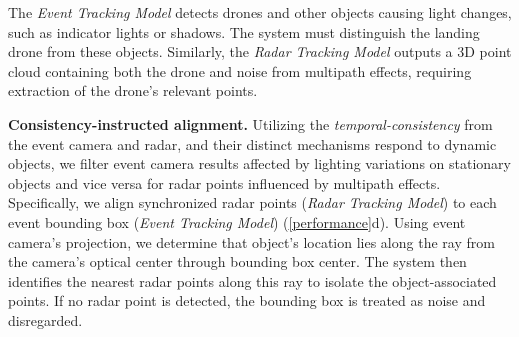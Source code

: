 The \textit{Event Tracking Model} detects drones and other objects causing light changes, such as indicator lights or shadows. The system must distinguish the landing drone from these objects. Similarly, the \textit{Radar Tracking Model} outputs a 3D point cloud containing both the drone and noise from multipath effects, requiring extraction of the drone’s relevant points.

\textbf{Consistency-instructed alignment.} 
Utilizing the \textit{temporal-consistency} from the event camera and radar, and their distinct mechanisms respond to dynamic objects, we filter event camera results affected by lighting variations on stationary objects and vice versa for radar points influenced by multipath effects.
Specifically, we align synchronized radar points (\textit{Radar Tracking Model}) to each event bounding box (\textit{Event Tracking Model}) (\fig \ref{performance}d). 
Using event camera's projection, we determine that object's location lies along the ray from the camera's optical center through bounding box center. 
The system then identifies the nearest radar points along this ray to isolate the object-associated points.
If no radar point is detected, the bounding box is treated as noise and disregarded.


